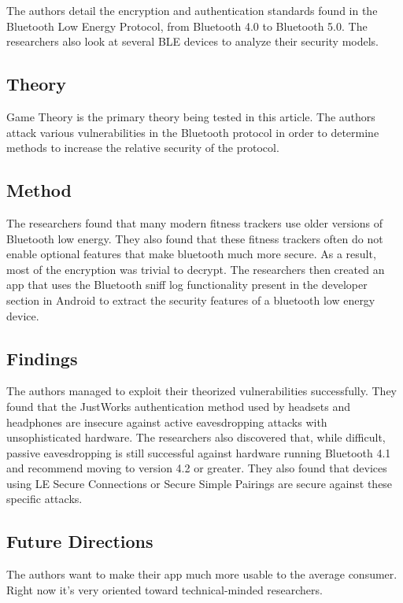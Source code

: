 \documentclass[letterpaper,12pt]{article}
\begin{document}
\noindent
The authors detail the encryption and authentication standards found in the Bluetooth Low Energy Protocol, from Bluetooth 4.0 to Bluetooth 5.0.  The researchers also look at several BLE devices to analyze their security models.

\subsection{Theory}

\noindent
Game Theory is the primary theory being tested in this article.  The authors attack various vulnerabilities in the Bluetooth protocol in order to determine methods to increase the relative security of the protocol.

\subsection{Method}

\noindent
The researchers found that many modern fitness trackers use older versions of Bluetooth low energy.  They also found that these fitness trackers often do not enable optional features that make bluetooth much more secure.  As a result, most of the encryption was trivial to decrypt.  The researchers then created an app that uses the Bluetooth sniff log functionality present in the developer section in Android to extract the security features of a bluetooth low energy device.

\subsection{Findings}

\noindent
The authors managed to exploit their theorized vulnerabilities successfully.  They found that the JustWorks authentication method used by headsets and headphones are insecure against active eavesdropping attacks with unsophisticated hardware.  The researchers also discovered that, while difficult, passive eavesdropping is still successful against hardware running Bluetooth 4.1 and recommend moving to version 4.2 or greater.  They also found that devices using LE Secure Connections or Secure Simple Pairings are secure against these specific attacks.

\subsection{Future Directions}

\noindent
The authors want to make their app much more usable to the average consumer.  Right now it's very oriented toward technical-minded researchers.
\end{document}
